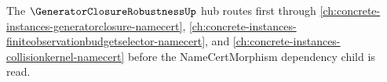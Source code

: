 The $\GeneratorClosureRobustnessUp$ hub routes first through \autoref{ch:concrete-instances-generatorclosure-namecert}, \autoref{ch:concrete-instances-finiteobservationbudgetselector-namecert}, and \autoref{ch:concrete-instances-collisionkernel-namecert} before the NameCertMorphism dependency child is read.



